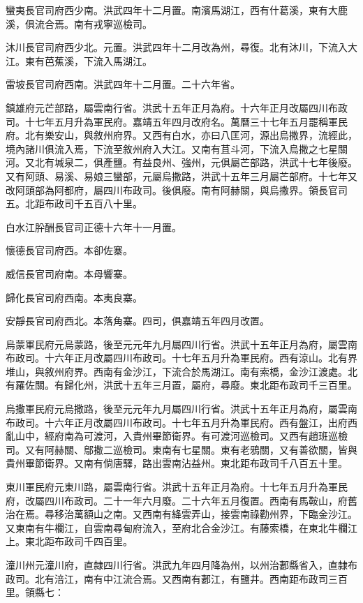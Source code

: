 蠻夷長官司府西少南。洪武四年十二月置。南濱馬湖江，西有什葛溪，東有大鹿溪，俱流合焉。南有戎寧巡檢司。

沐川長官司府西少北。元置。洪武四年十二月改為州，尋復。北有沐川，下流入大江。東有芭蕉溪，下流入馬湖江。

雷坡長官司府西南。洪武四年十二月置。二十六年省。

鎮雄府元芒部路，屬雲南行省。洪武十五年正月為府。十六年正月改屬四川布政司。十七年五月升為軍民府。嘉靖五年四月改府名。萬曆三十七年五月罷稱軍民府。北有樂安山，與敘州府界。又西有白水，亦曰八匡河，源出烏撒界，流經此，境內諸川俱流入焉，下流至敘州府入大江。又南有苴斗河，下流入烏撒之七星關河。又北有堿泉二，俱產鹽。有益良州、強州，元俱屬芒部路，洪武十七年後廢。又有阿頭、易溪、易娘三蠻部，元屬烏撒路，洪武十五年三月屬芒部府。十七年又改阿頭部為阿都府，屬四川布政司。後俱廢。南有阿赫關，與烏撒界。領長官司五。北距布政司千五百八十里。

白水江肸酬長官司正德十六年十一月置。

懷德長官司府西。本卻佐寨。

威信長官司府南。本母響寨。

歸化長官司府西南。本夷良寨。

安靜長官司府西北。本落角寨。四司，俱嘉靖五年四月改置。

烏蒙軍民府元烏蒙路，後至元元年九月屬四川行省。洪武十五年正月為府，屬雲南布政司。十六年正月改屬四川布政司。十七年五月升為軍民府。西有涼山。北有界堆山，與敘州府界。西南有金沙江，下流合於馬湖江。南有索橋，金沙江渡處。北有羅佐關。有歸化州，洪武十五年三月置，屬府，尋廢。東北距布政司千三百里。

烏撒軍民府元烏撒路，後至元元年九月屬四川行省。洪武十五年正月為府，屬雲南布政司。十六年正月改屬四川布政司。十七年五月升為軍民府。西有盤江，出府西亂山中，經府南為可渡河，入貴州畢節衛界。有可渡河巡檢司。又西有趙班巡檢司。又有阿赫關、鄔撒二巡檢司。東南有七星關。東有老鴉關，又有善欲關，皆與貴州畢節衛界。又南有倘唐驛，路出雲南沾益州。東北距布政司千八百五十里。

東川軍民府元東川路，屬雲南行省。洪武十五年正月為府。十七年五月升為軍民府，改屬四川布政司。二十一年六月廢。二十六年五月復置。西南有馬鞍山，府舊治在焉。尋移治萬額山之南。又西南有絳雲弄山，接雲南祿勸州界，下臨金沙江。又東南有牛欄江，自雲南尋甸府流入，至府北合金沙江。有藤索橋，在東北牛欄江上。東北距布政司千四百里。

潼川州元潼川府，直隸四川行省。洪武九年四月降為州，以州治郪縣省入，直隸布政司。北有涪江，南有中江流合焉。又西南有郪江，有鹽井。西南距布政司三百里。領縣七：

